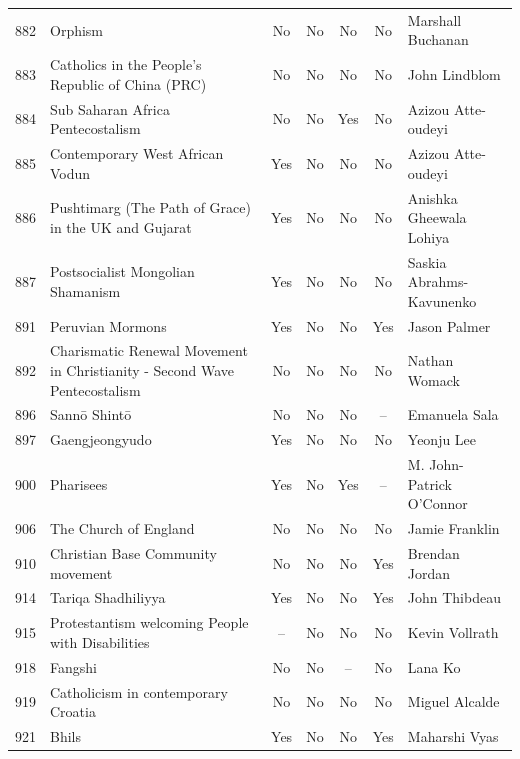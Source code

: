 {\begin{longtable}{rp{3.5cm}ccccp{3cm}}
882 & {\raggedright Orphism} & No & No & No & No & {\raggedright Marshall Buchanan} \\
883 & {\raggedright Catholics in the People's Republic of China (PRC)} & No & No & No & No & {\raggedright John Lindblom} \\
884 & {\raggedright Sub Saharan Africa Pentecostalism} & No & No & Yes & No & {\raggedright Azizou Atte-oudeyi} \\
885 & {\raggedright Contemporary West African Vodun} & Yes & No & No & No & {\raggedright Azizou Atte-oudeyi} \\
886 & {\raggedright Pushtimarg (The Path of Grace) in the UK and Gujarat} & Yes & No & No & No & {\raggedright Anishka Gheewala Lohiya} \\
887 & {\raggedright Postsocialist Mongolian Shamanism} & Yes & No & No & No & {\raggedright Saskia Abrahms-Kavunenko} \\
891 & {\raggedright Peruvian Mormons} & Yes & No & No & Yes & {\raggedright Jason Palmer} \\
892 & {\raggedright Charismatic Renewal Movement in Christianity - Second Wave Pentecostalism} & No & No & No & No & {\raggedright Nathan Womack} \\
896 & {\raggedright Sannō Shintō} & No & No & No & -- & {\raggedright Emanuela Sala} \\
897 & {\raggedright Gaengjeongyudo} & Yes & No & No & No & {\raggedright Yeonju Lee} \\
900 & {\raggedright Pharisees} & Yes & No & Yes & -- & {\raggedright M. John-Patrick O’Connor} \\
906 & {\raggedright The Church of England} & No & No & No & No & {\raggedright Jamie Franklin} \\
910 & {\raggedright Christian Base Community movement} & No & No & No & Yes & {\raggedright Brendan Jordan} \\
914 & {\raggedright Tariqa Shadhiliyya} & Yes & No & No & Yes & {\raggedright John Thibdeau} \\
915 & {\raggedright Protestantism welcoming People with Disabilities} & -- & No & No & No & {\raggedright Kevin Vollrath} \\
918 & {\raggedright Fangshi} & No & No & -- & No & {\raggedright Lana Ko} \\
919 & {\raggedright Catholicism in contemporary Croatia} & No & No & No & No & {\raggedright Miguel Alcalde} \\
921 & {\raggedright Bhils} & Yes & No & No & Yes & {\raggedright Maharshi Vyas} \\

\end{longtable}}
